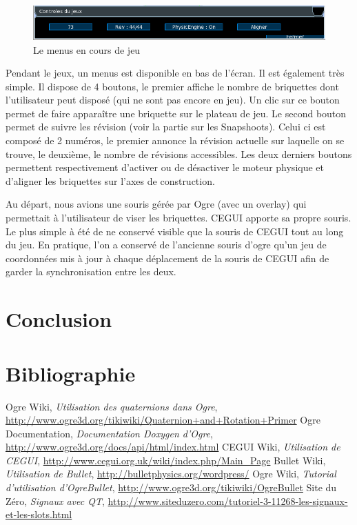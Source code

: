 \documentclass[frenchb,twoside]{EPURapport}
\begin{document}
		\begin{figure}[h]
			\centering
			\includegraphics[scale=0.75]{images/menu_jeu.png}
			\caption{\label{fig:menu_jeu}Le menus en cours de jeu}
		\end{figure}      
        Pendant le jeux, un menus est disponible en bas de l'écran. Il est
        également très simple. Il dispose de 4 boutons, le premier affiche le
        nombre de briquettes dont l'utilisateur peut disposé (qui ne sont pas
        encore en jeu). Un clic sur ce bouton permet de faire apparaître une
        briquette sur le plateau de jeu. Le second bouton permet de suivre les
        révision (voir la partie sur les Snapshoots). Celui ci est composé de 2
        numéros, le premier annonce la révision actuelle sur laquelle on se
        trouve, le deuxième, le nombre de révisions accessibles. Les deux
        derniers boutons permettent respectivement d'activer ou de désactiver le
        moteur physique et d'aligner les briquettes sur l'axes de construction.

        Au départ, nous avions une souris gérée par Ogre (avec un overlay) qui
        permettait à l'utilisateur de viser les briquettes. CEGUI apporte sa
        propre souris. Le plus simple à été de ne conservé visible que la
        souris de CEGUI tout au long du jeu. En pratique, l'on a conservé de
        l'ancienne souris d'ogre qu'un jeu de coordonnées mis à jour à chaque
        déplacement de la souris de CEGUI afin de garder la synchronisation
        entre les deux.
        
        
\chapter{Conclusion}




\chapter{Bibliographie}

\begin{bibliographie}	
	 Ogre Wiki, \textit{Utilisation des quaternions dans Ogre}, \url{http://www.ogre3d.org/tikiwiki/Quaternion+and+Rotation+Primer}
	 Ogre Documentation, \textit{Documentation Doxygen d'Ogre}, \url{http://www.ogre3d.org/docs/api/html/index.html}
	 CEGUI Wiki, \textit{Utilisation de CEGUI}, \url{http://www.cegui.org.uk/wiki/index.php/Main_Page}
	 Bullet Wiki, \textit{Utilisation de Bullet}, \url{http://bulletphysics.org/wordpress/}
	 Ogre Wiki, \textit{Tutorial d'utilisation d'OgreBullet}, \url{http://www.ogre3d.org/tikiwiki/OgreBullet}
	 Site du Zéro, \textit{Signaux avec QT}, \url{http://www.siteduzero.com/tutoriel-3-11268-les-signaux-et-les-slots.html}
	\end{bibliographie}	
\end{document}
